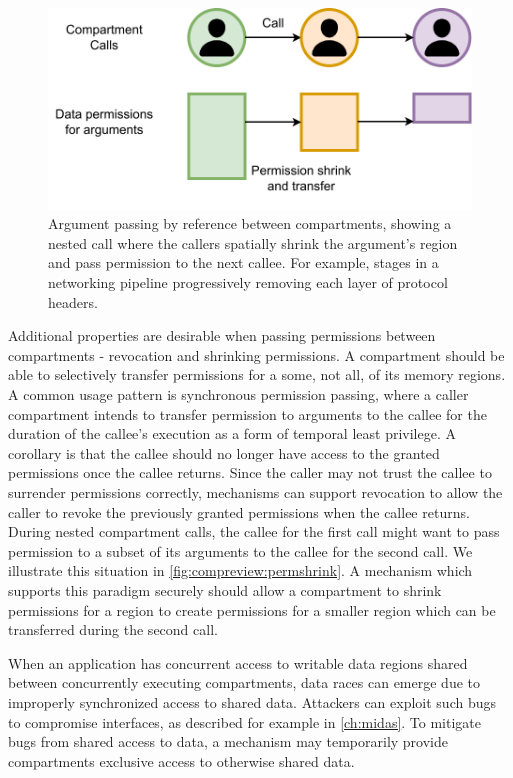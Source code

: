 \begin{figure}
      \centering
      \includegraphics[width=0.75\linewidth]{media/compreview/permission_shrink_grant.pdf}
      \caption[Argument passing by reference between compartments.]
              {Argument passing by reference between compartments, showing a nested call
              where the callers spatially shrink the argument's region and pass permission
              to the next callee. For example, stages in a networking pipeline progressively
              removing each layer of protocol headers.}
      \label{fig:compreview:permshrink}
\end{figure}
Additional properties are desirable when passing
permissions between compartments - revocation and shrinking permissions.
A compartment should be able to selectively transfer permissions for a 
some, not all, of its memory regions.
A common usage pattern is synchronous permission passing, where a caller
compartment intends to transfer permission to arguments to the callee for the
duration of the callee's execution as a form of temporal least privilege.
A corollary is that the callee should no longer have access to the granted
permissions once the callee returns.
Since the caller may not trust the callee to surrender permissions correctly, 
mechanisms can support revocation to allow the caller to revoke the previously
granted permissions when the callee returns.
During nested compartment calls, the callee for the first call might want to pass
permission to a subset of its arguments to the callee for the second call.
We illustrate this situation in \autoref{fig:compreview:permshrink}.
A mechanism which supports this paradigm securely should allow a compartment to
shrink permissions for a region to create permissions for a smaller region
which can be transferred during the second call. 

When an application has concurrent access to writable data regions shared 
between concurrently executing compartments, data races can emerge due to
improperly synchronized access to shared data.
Attackers can exploit such bugs to compromise interfaces, as described for
example in \autoref{ch:midas}.
To mitigate bugs from shared access to data, a mechanism may temporarily provide
compartments exclusive access to otherwise shared data.

